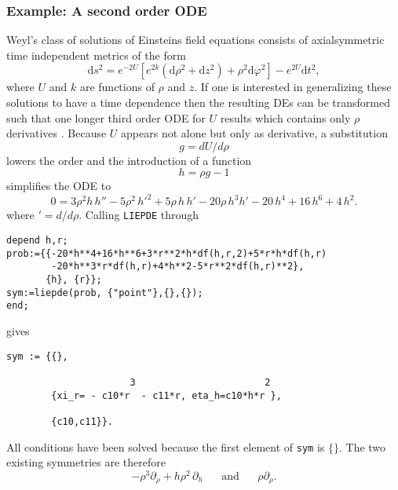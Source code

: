 \subsubsection{Example: A second order ODE}
Weyl's class of solutions of Einsteins field equations consists of
axialsymmetric time independent metrics of the form
\begin{equation}
{\mathrm{d}} s^2 = e^{-2 U} \left[ e^{2 k}  \left( \mathrm{d} \rho^2 + \mathrm{d}
z^2 \right)+\rho^2 \mathrm{d} \varphi^2 \right] - e^{2 U} \mathrm{d} t^2,
\end{equation}
where $U$ and $k$ are functions of $\rho$ and $z$. If one is interested in
generalizing these solutions to have a time dependence then the resulting
DEs can be transformed such that one longer third order ODE for $U$ results
which contains only $\rho$ derivatives \cite{Markus}. Because $U$ appears
not alone but only as derivative, a substitution
\begin{equation}
g = dU/d\rho      \label{g1dgl}
\end{equation}
lowers the order and the introduction of a function
\begin{equation}
h = \rho g - 1    \label{g2dgl}
\end{equation}
simplifies the ODE to
\begin{equation}
0 = 3\rho^2h\,h''
-5\rho^2\,h'^2+5\rho\,h\,h'-20\rho\,h^3h'-20\,h^4+16\,h^6+4\,h^2. \label{hdgl}
\end{equation}
where $'= d/d\rho$.
Calling \texttt{LIEPDE} through
{\small \begin{verbatim}
depend h,r;
prob:={{-20*h**4+16*h**6+3*r**2*h*df(h,r,2)+5*r*h*df(h,r)
        -20*h**3*r*df(h,r)+4*h**2-5*r**2*df(h,r)**2},
       {h}, {r}};
sym:=liepde(prob, {"point"},{},{});
end; \end{verbatim}}
gives {\small \begin{verbatim}
sym := {{},

                      3                       2
        {xi_r= - c10*r  - c11*r, eta_h=c10*h*r },

        {c10,c11}}.
\end{verbatim}}
All conditions have been solved because the first element of \texttt{sym}
is $\{\}$. The two existing symmetries are therefore
\begin{equation}
  - \rho^3 \partial_{\rho} +  h \rho^2 \,\partial_{h} \;\;\;\;\;\;\mbox{and}
  \;\;\;\;\;\;\rho \partial_{\rho}.
\end{equation}
